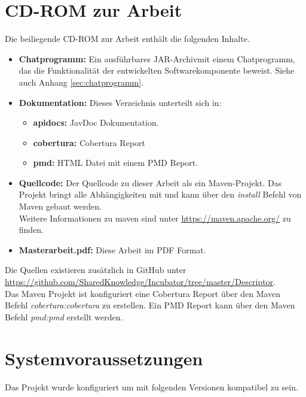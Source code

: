 \documentclass[a4paper]{article}
\begin{document}
	\newpage	
	\begin{appendix}
	
	\section{CD-ROM zur Arbeit}
	\label{sec:CD}
	
	Die beiliegende CD-ROM zur Arbeit enthält die folgenden Inhalte.
	
	\begin{itemize}
		\item \textbf{Chatprogramm:} Ein ausführbares JAR-Archivmit einem
		Chatprogramm, das die Funktionalität der entwickelten 
		Softwarekomponente beweist. Siehe auch Anhang \ref{sec:chatprogramm}.
		\item \textbf{Dokumentation:} Dieses Verzeichnis unterteilt sich in:
		\begin{itemize}
			\item \textbf{apidocs:} JavDoc Dokumentation.
			\item \textbf{cobertura:} Cobertura Report
			\item \textbf{pmd:} HTML Datei mit einem PMD Report.
		\end{itemize} 
		\item \textbf{Quellcode:} Der Quellcode zu dieser Arbeit
		als ein Maven-Projekt. Das Projekt bringt alle Abhängigkeiten mit
		und kann über den \emph{install} Befehl von Maven gebaut werden. \\
		Weitere Informationen zu maven sind unter \url{https://maven.apache.org/}
		zu finden.	
		\item \textbf{Masterarbeit.pdf:} Diese Arbeit im PDF Format.
	\end{itemize} 
	
	Die Quellen existieren zusätzlich in GitHub unter 
	\url{https://github.com/SharedKnowledge/Incubator/tree/master/Descriptor}. \\
	
	Das Maven Projekt ist konfiguriert eine Cobertura Report über den Maven Befehl 
	\emph{cobertura:cobertura} zu erstellen. Ein PMD Report kann über den Maven
	Befehl \emph{pmd:pmd} erstellt werden.
	
	\newpage
	\section{Systemvoraussetzungen}
	
	Das Projekt wurde konfiguriert um mit folgenden Versionen kompatibel zu sein.	
	

\end{appendix}
\end{document}
